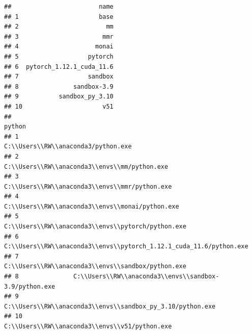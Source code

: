 \documentclass[
]{book}
\theoremstyle{definition}
\theoremstyle{definition}
\theoremstyle{definition}
\theoremstyle{definition}
\theoremstyle{remark}
\begin{document}
\begin{verbatim}
##                        name
## 1                      base
## 2                        mm
## 3                       mmr
## 4                     monai
## 5                   pytorch
## 6  pytorch_1.12.1_cuda_11.6
## 7                   sandbox
## 8               sandbox-3.9
## 9           sandbox_py_3.10
## 10                      v51
##                                                                 python
## 1                                  C:\\Users\\RW\\anaconda3/python.exe
## 2                        C:\\Users\\RW\\anaconda3\\envs\\mm/python.exe
## 3                       C:\\Users\\RW\\anaconda3\\envs\\mmr/python.exe
## 4                     C:\\Users\\RW\\anaconda3\\envs\\monai/python.exe
## 5                   C:\\Users\\RW\\anaconda3\\envs\\pytorch/python.exe
## 6  C:\\Users\\RW\\anaconda3\\envs\\pytorch_1.12.1_cuda_11.6/python.exe
## 7                   C:\\Users\\RW\\anaconda3\\envs\\sandbox/python.exe
## 8               C:\\Users\\RW\\anaconda3\\envs\\sandbox-3.9/python.exe
## 9           C:\\Users\\RW\\anaconda3\\envs\\sandbox_py_3.10/python.exe
## 10                      C:\\Users\\RW\\anaconda3\\envs\\v51/python.exe
\end{verbatim}
\end{document}
